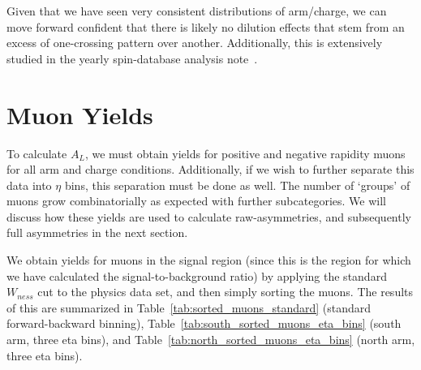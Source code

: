 Given that we have seen very consistent distributions of arm/charge, we can move
forward confident that there is likely no dilution effects that stem from an
excess of one-crossing pattern over another. Additionally, this is extensively
studied in the yearly spin-database analysis note~\cite{Kim2014}.

\clearpage
\section{Muon Yields}

To calculate $A_L$, we must obtain yields for positive and negative rapidity
muons for all arm and charge conditions. Additionally, if we wish to further
separate this data into $\eta$ bins, this separation must be done as well. The
number of `groups' of muons grow combinatorially as expected with further
subcategories. We will discuss how these yields are used to calculate
raw-asymmetries, and subsequently full asymmetries in the next section.

We obtain yields for muons in the signal region (since this is the region for
which we have calculated the signal-to-background ratio) by applying the
standard $W_{ness}$ cut to the physics data set, and then simply sorting the
muons. The results of this are summarized in
Table~\ref{tab:sorted_muons_standard} (standard forward-backward binning),
Table~\ref{tab:south_sorted_muons_eta_bins} (south arm, three eta bins), and
Table~\ref{tab:north_sorted_muons_eta_bins} (north arm, three eta bins).

